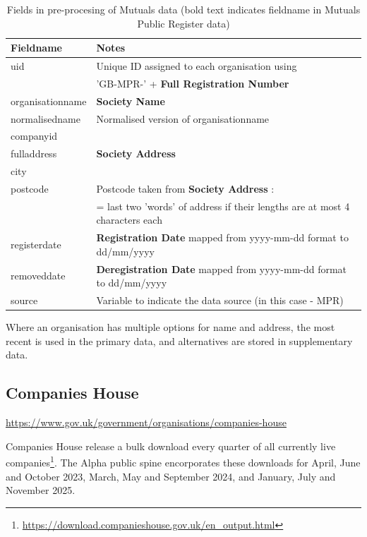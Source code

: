 \documentclass{article}
\begin{document}
\begin{table}[h]
  \centering
  \begin{tabularx}{\textwidth}{|l|X|}
    \hline
    Fieldname  &	Notes \\
    \hline \hline
uid & Unique ID assigned to each organisation using \\
&'GB-MPR-' + \textbf{Full Registration Number} \\ \hline
organisationname & \textbf{Society Name} \\ \hline
normalisedname & Normalised version of organisationname\\ \hline
companyid &  \\ \hline
fulladdress & \textbf{Society Address} \\ \hline
city & \\ \hline
postcode & Postcode taken from \textbf{Society Address} : \\ 
&  = last two 'words' of address if their lengths are at most 4 characters each\\ \hline
registerdate & \textbf{Registration Date} mapped from yyyy-mm-dd format to dd/mm/yyyy\\ \hline
removeddate & \textbf{Deregistration Date} mapped from yyyy-mm-dd format to dd/mm/yyyy\\ \hline
source & Variable to indicate the data source (in this case - MPR) \\ \hline
\hline 
\end{tabularx}
  \caption{Fields in pre-procesing of Mutuals data (bold text indicates fieldname in Mutuals Public Register data)}
  \label{tab:mpr_preprocess}
  
\end{table}

Where an organisation has multiple options for name and address, the most recent
is used in the primary data, and alternatives are stored in supplementary data.


\clearpage
\subsection{Companies House}
\url{https://www.gov.uk/government/organisations/companies-house}



Companies House release a bulk download every quarter of all currently live companies\footnote{\url{https://download.companieshouse.gov.uk/en_output.html}}. The Alpha public 
spine encorporates these downloads for April, June and October 2023, March, May and September 2024, and January, July and November 2025. 
\end{document}
